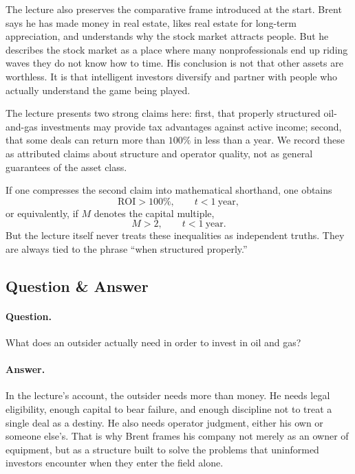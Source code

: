 The lecture also preserves the comparative frame introduced at the start. Brent says he has made money in real estate, likes real estate for long-term appreciation, and understands why the stock market attracts people. But he describes the stock market as a place where many nonprofessionals end up riding waves they do not know how to time. His conclusion is not that other assets are worthless. It is that intelligent investors diversify and partner with people who actually understand the game being played.

\begin{remark}
The lecture presents two strong claims here: first, that properly structured oil-and-gas investments may provide tax advantages against active income; second, that some deals can return more than \(100\%\) in less than a year. We record these as attributed claims about structure and operator quality, not as general guarantees of the asset class.
\end{remark}

If one compresses the second claim into mathematical shorthand, one obtains
\begin{equation}
\mathrm{ROI} > 100\%, \qquad t < 1\ \mathrm{year},
\end{equation}
or equivalently, if \(M\) denotes the capital multiple,
\begin{equation}
M>2, \qquad t < 1\ \mathrm{year}.
\end{equation}
But the lecture itself never treats these inequalities as independent truths. They are always tied to the phrase ``when structured properly.''

\subsection{Question \& Answer}

\paragraph{Question.} What does an outsider actually need in order to invest in oil and gas?

\paragraph{Answer.} In the lecture's account, the outsider needs more than money. He needs legal eligibility, enough capital to bear failure, and enough discipline not to treat a single deal as a destiny. He also needs operator judgment, either his own or someone else's. That is why Brent frames his company not merely as an owner of equipment, but as a structure built to solve the problems that uninformed investors encounter when they enter the field alone.

